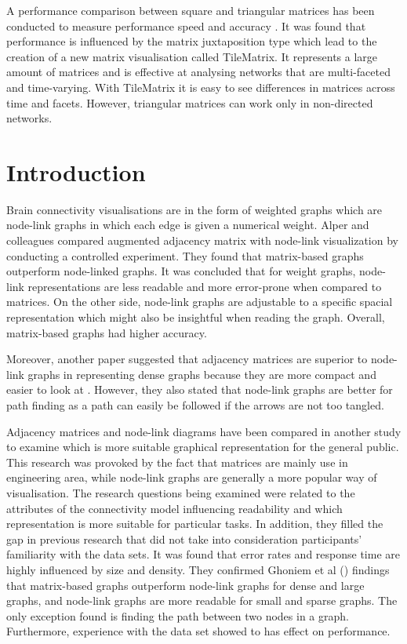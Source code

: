 \documentclass{l4proj}
\begin{document}
A performance comparison between square and triangular matrices has been conducted to measure performance speed and accuracy \cite{liu2015effects}. It was found that performance is influenced by the matrix juxtaposition type which lead to the creation of a new matrix visualisation called TileMatrix. It represents a large amount of matrices and is effective at analysing networks that are multi-faceted and time-varying. With TileMatrix it is easy to see differences in matrices across time and facets. However, triangular matrices can work only in non-directed networks. 

\chapter{Introduction}

Brain connectivity visualisations are in the form of weighted graphs which are node-link graphs in which each edge is given a numerical weight. Alper and colleagues \cite{alper2013weighted} compared augmented adjacency matrix with node-link visualization by conducting a controlled experiment. They found that matrix-based graphs outperform node-linked graphs. It was concluded that for weight graphs, node-link representations are less readable and more error-prone when compared to matrices. On the other side, node-link graphs are adjustable to a specific spacial representation which might also be insightful when reading the graph. Overall, matrix-based graphs had higher accuracy.  

Moreover, another paper suggested that adjacency matrices are superior to node-link graphs in representing dense graphs because they are more compact and easier to look at \cite{sheny2007path}. However, they also stated that node-link graphs are better for path finding as a path can easily be followed if the arrows are not too tangled.





Adjacency matrices and node-link diagrams have been compared in another study \cite{keller2006matrices} to examine which is more suitable graphical representation for the general public. This research was provoked by the fact that matrices are mainly use in engineering area, while node-link graphs are generally a more popular way of visualisation. The research questions being examined were related to the attributes of the connectivity model influencing readability and which representation is more suitable for particular tasks. In addition, they filled the gap in previous research that did not take into consideration participants' familiarity with the data sets. It was found that error rates and response time are highly influenced by size and density. They confirmed Ghoniem et al () findings that matrix-based graphs outperform node-link graphs for dense and large graphs, and node-link graphs are more readable for small and sparse graphs. The only exception found is finding the path between two nodes in a graph. Furthermore, experience with the data set showed to has effect on performance. 
\end{document}
